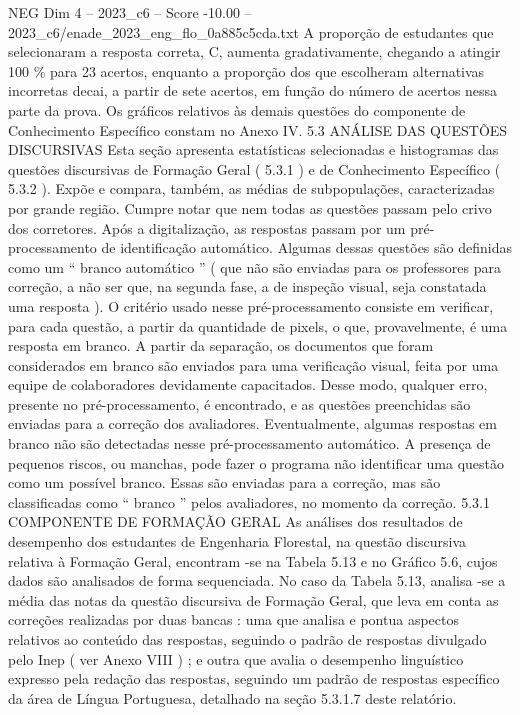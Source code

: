\begin{textsample}{NEG Dim 4 – 2023\_c6 – Score -10.00 – 2023\_c6/enade\_2023\_eng\_flo\_0a885c5cda.txt}
A proporção de estudantes que selecionaram a resposta correta, C, aumenta gradativamente, chegando a atingir 100 \% para 23 acertos, enquanto a proporção dos que escolheram alternativas incorretas decai, a partir de sete acertos, em função do número de acertos nessa parte da prova.
Os gráficos relativos às demais questões do componente de Conhecimento Específico constam no Anexo IV. 5.3 ANÁLISE DAS QUESTÕES DISCURSIVAS Esta seção apresenta estatísticas selecionadas e histogramas das questões discursivas de Formação Geral ( 5.3.1 ) e de Conhecimento Específico ( 5.3.2 ).
Expõe e compara, também, as médias de subpopulações, caracterizadas por grande região.
Cumpre notar que nem todas as questões passam pelo crivo dos corretores.
Após a digitalização, as respostas passam por um pré-processamento de identificação automático.
Algumas dessas questões são definidas como um “ branco automático ” ( que não são enviadas para os professores para correção, a não ser que, na segunda fase, a de inspeção visual, seja constatada uma resposta ).
O critério usado nesse pré-processamento consiste em verificar, para cada questão, a partir da quantidade de pixels, o que, provavelmente, é uma resposta em branco.
A partir da separação, os documentos que foram considerados em branco são enviados para uma verificação visual, feita por uma equipe de colaboradores devidamente capacitados.
Desse modo, qualquer erro, presente no pré-processamento, é encontrado, e as questões preenchidas são enviadas para a correção dos avaliadores.
Eventualmente, algumas respostas em branco não são detectadas nesse pré-processamento automático.
A presença de pequenos riscos, ou manchas, pode fazer o programa não identificar uma questão como um possível branco.
Essas são enviadas para a correção, mas são classificadas como “ branco ” pelos avaliadores, no momento da correção. 5.3.1 COMPONENTE DE FORMAÇÃO GERAL As análises dos resultados de desempenho dos estudantes de Engenharia Florestal, na questão discursiva relativa à Formação Geral, encontram -se na Tabela 5.13 e no Gráfico 5.6, cujos dados são analisados de forma sequenciada.
No caso da Tabela 5.13, analisa -se a média das notas da questão discursiva de Formação Geral, que leva em conta as correções realizadas por duas bancas : uma que analisa e pontua aspectos relativos ao conteúdo das respostas, seguindo o padrão de respostas divulgado pelo Inep ( ver Anexo VIII ) ; e outra que avalia o desempenho linguístico expresso pela redação das respostas, seguindo um padrão de respostas específico da área de Língua Portuguesa, detalhado na seção 5.3.1.7 deste relatório.

\end{textsample}
